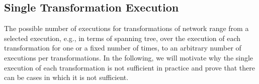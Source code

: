 

\subsection{Single Transformation Execution}

The possible number of executions for transformations of network range from a selected execution, e.g., in terms of spanning tree, over the execution of each transformation for one or a fixed number of times, to an arbitrary number of executions per transformations.
In the following, we will motivate why the single execution of each transformation is not sufficient in practice and prove that there can be cases in which it is not sufficient.

